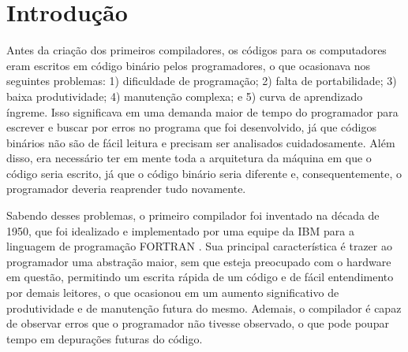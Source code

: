 \documentclass[
	12pt,				%
	oneside,
	a4paper,			%
	english,			%
	french,				%
	spanish,			%
	brazil,				%
	]{abntex2}
\begin{document}

\frenchspacing 


\imprimircapa

\imprimirfolhaderosto*



\listoffigures*
\clearpage

\listoftables*
\clearpage

\tableofcontents*


\textual


\chapter{Introdução}

Antes da criação dos primeiros compiladores, os códigos para os computadores eram escritos em código binário pelos programadores, o que ocasionava nos seguintes problemas: 1) dificuldade de programação; 2) falta de portabilidade; 3) baixa produtividade; 4) manutenção complexa; e 5) curva de aprendizado íngreme. Isso significava em uma demanda maior de tempo do programador para escrever e buscar por erros no programa que foi desenvolvido, já que códigos binários não são de fácil leitura e precisam ser analisados cuidadosamente. Além disso, era necessário ter em mente toda a arquitetura da máquina em que o código seria escrito, já que o código binário seria diferente e, consequentemente, o programador deveria reaprender tudo novamente.

Sabendo desses problemas, o primeiro compilador foi inventado na década de 1950, que foi idealizado e implementado por uma equipe da IBM para a linguagem de programação FORTRAN \cite{Compilers-Kenneth}. Sua principal característica é trazer ao programador uma abstração maior, sem que esteja preocupado com o hardware em questão, permitindo um escrita rápida de um código e de fácil entendimento por demais leitores, o que ocasionou em um aumento significativo de produtividade e de manutenção futura do mesmo. Ademais, o compilador é capaz de observar erros que o programador não tivesse observado, o que pode poupar tempo em depurações futuras do código.
\end{document}
